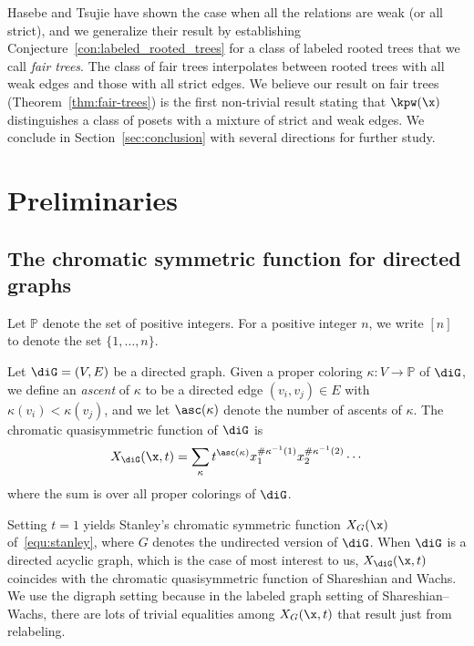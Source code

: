  Hasebe and Tsujie \cite{HaTs17} have shown the case when all the relations are weak (or all strict), and we generalize their result by establishing Conjecture~\ref{con:labeled_rooted_trees} for a class of labeled rooted trees that we call \emph{fair trees}.  The class of fair trees interpolates between rooted trees with all weak edges and those with all strict edges.  We believe our result on fair trees (Theorem~\ref{thm:fair-trees}) is the first non-trivial result stating that $\kpw(\x)$ distinguishes a class of posets with a mixture of strict and weak edges.  We conclude in Section~\ref{sec:conclusion} with several directions for further study.  


\section{Preliminaries}\label{sec:prelims}

\subsection{The chromatic symmetric function for directed graphs}

Let $\mathbb{P}$ denote the set of positive integers.  For a positive integer $n$, we write $[n]$ to denote the set $\{1,\ldots,n\}$.

\begin{definition}\label{def:xg}
Let $\diG = (V,E)$ be a directed graph.  Given a proper coloring $\kappa: V \to \mathbb{P}$ of $\diG$, we define an \emph{ascent} of $\kappa$ to be a directed edge $(v_i, v_j) \in E$ with $\kappa(v_i) < \kappa(v_j)$, and we let $\asc(\kappa)$ denote the number of ascents of $\kappa$.  The chromatic quasisymmetric function of $\diG$ is 
\begin{equation}\label{equ:xgt}
X_{\diG}(\x, t) = \sum_{\kappa} t^{\asc(\kappa)} x_1^{\# \kappa^{-1}(1)} x_2^{\# \kappa^{-1}(2)} \cdots
\end{equation}
where the sum is over all proper colorings of $\diG$.
\end{definition}

Setting $t=1$ yields Stanley's chromatic symmetric function $X_G(\x)$ of~\eqref{equ:stanley}, where $G$ denotes the undirected version of $\diG$.  When $\diG$ is a directed acyclic graph, which is the case of most interest to us, $X_{\diG}(\x, t)$ coincides with the chromatic quasisymmetric function of Shareshian and Wachs.  We use the digraph setting because in the labeled graph setting of Shareshian--Wachs, there are lots of trivial equalities among $X_G(\x, t)$ that result just from relabeling.

